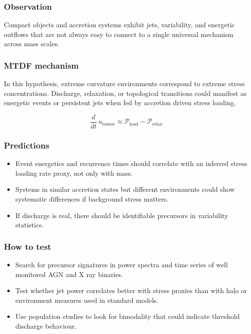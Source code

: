 \documentclass[11pt,a4paper]{article}
\begin{document}
\subsubsection{Observation}
Compact objects and accretion systems exhibit jets, variability, and energetic outflows that are not always easy to connect to a single universal mechanism across mass scales.

\subsubsection{MTDF mechanism}
In this hypothesis, extreme curvature environments correspond to extreme stress concentrations. Discharge, relaxation, or topological transitions could manifest as energetic events or persistent jets when fed by accretion driven stress loading.

$$
\frac{d}{dt}\,u_{\mathrm{tensor}} \approx \mathcal{P}_{\mathrm{load}} - \mathcal{P}_{\mathrm{relax}}
$$

\subsubsection{Predictions}
\begin{itemize}
  \item Event energetics and recurrence times should correlate with an inferred stress loading rate proxy, not only with mass.
  \item Systems in similar accretion states but different environments could show systematic differences if background stress matters.
  \item If discharge is real, there should be identifiable precursors in variability statistics.
\end{itemize}

\subsubsection{How to test}
\begin{itemize}
  \item Search for precursor signatures in power spectra and time series of well monitored AGN and X ray binaries.
  \item Test whether jet power correlates better with stress proxies than with halo or environment measures used in standard models.
  \item Use population studies to look for bimodality that could indicate threshold discharge behaviour.
\end{itemize}
\end{document}

